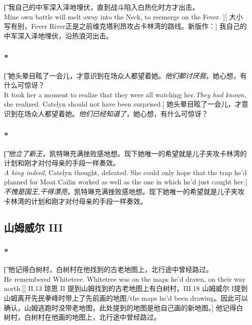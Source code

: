 \documentclass[12pt,a4paper]{article}
\begin{document}
\subsubsection{}\t[
	我自己的中军深入泽地埋伏，直到战斗陷入白热化时方才出击。\\
	Mine own battle will melt away into the Neck, to reemerge on the Fever. ][
	大小写有别，Fever River正是之前维克塔利昂攻占卡林湾的路线。新版作：]
	我自己的中军深入泽地埋伏，沿热浪河出击。
		
\subsubsection{\color{red}*}\t[
	她头晕目眩了一会儿，才意识到在场众人都望着她。\emph{他们都讨厌我}，她心想，有什么可惊讶？\\
	It took her a moment to realize that they were all watching her.\emph{They had known}, she realized. Catelyn should not have been surprised.]
	她头晕目眩了一会儿，才意识到在场众人都望着她。\emph{他们已经知道了}，她心想，有什么可惊讶？
	
\subsubsection{\color{red}*}\t[
	\emph{他立了新王}，凯特琳充满挫败感地想。现下她唯一的希望就是儿子夹攻卡林湾的计划和刚才对付母亲的手段一样奏效。\\
\emph{A king indeed}, Catelyn thought, defeated. She could only hope that the trap he'd planned for Moat Cailin worked as well as the one in which he'd just caught her.]
	\emph{不愧是国王,干得漂亮}，凯特琳充满挫败感地想。现下她唯一的希望就是儿子夹攻卡林湾的计划和刚才对付母亲的手段一样奏效。
	
\subsection{山姆威尔 III}
\subsubsection{\color{red}*}\t[
	他记得白树村，白树村在他找到的古老地图上，北行途中曾经路过。\\
	He remembered Whitetree. Whitetree was on the maps he'd drawn, on their way north.][
	II.13 琼恩 II 提到山姆找到的古老地图上有白树村，III.18 山姆威尔 I提到山姆离开先民拳峰时带上了先前画的地图/the maps he'd been drawing。因此可以确认，山姆逃跑时没带老地图，此处提到的地图是他自己画的新地图。]
	他记得白树村，白树村在他画的地图上，北行途中曾经路过。
	
\end{document}
